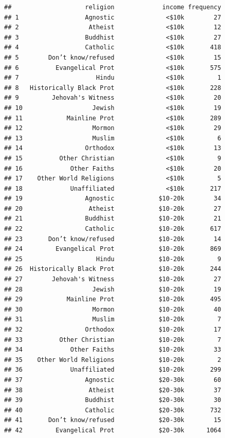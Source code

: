 \documentclass[12pt,letterpaperpaper,openany]{book}
\begin{document}
\begin{verbatim}
##                    religion             income frequency
## 1                  Agnostic              <$10k        27
## 2                   Atheist              <$10k        12
## 3                  Buddhist              <$10k        27
## 4                  Catholic              <$10k       418
## 5        Don’t know/refused              <$10k        15
## 6          Evangelical Prot              <$10k       575
## 7                     Hindu              <$10k         1
## 8   Historically Black Prot              <$10k       228
## 9         Jehovah's Witness              <$10k        20
## 10                   Jewish              <$10k        19
## 11            Mainline Prot              <$10k       289
## 12                   Mormon              <$10k        29
## 13                   Muslim              <$10k         6
## 14                 Orthodox              <$10k        13
## 15          Other Christian              <$10k         9
## 16             Other Faiths              <$10k        20
## 17    Other World Religions              <$10k         5
## 18             Unaffiliated              <$10k       217
## 19                 Agnostic            $10-20k        34
## 20                  Atheist            $10-20k        27
## 21                 Buddhist            $10-20k        21
## 22                 Catholic            $10-20k       617
## 23       Don’t know/refused            $10-20k        14
## 24         Evangelical Prot            $10-20k       869
## 25                    Hindu            $10-20k         9
## 26  Historically Black Prot            $10-20k       244
## 27        Jehovah's Witness            $10-20k        27
## 28                   Jewish            $10-20k        19
## 29            Mainline Prot            $10-20k       495
## 30                   Mormon            $10-20k        40
## 31                   Muslim            $10-20k         7
## 32                 Orthodox            $10-20k        17
## 33          Other Christian            $10-20k         7
## 34             Other Faiths            $10-20k        33
## 35    Other World Religions            $10-20k         2
## 36             Unaffiliated            $10-20k       299
## 37                 Agnostic            $20-30k        60
## 38                  Atheist            $20-30k        37
## 39                 Buddhist            $20-30k        30
## 40                 Catholic            $20-30k       732
## 41       Don’t know/refused            $20-30k        15
## 42         Evangelical Prot            $20-30k      1064

\end{verbatim}
\end{document}
